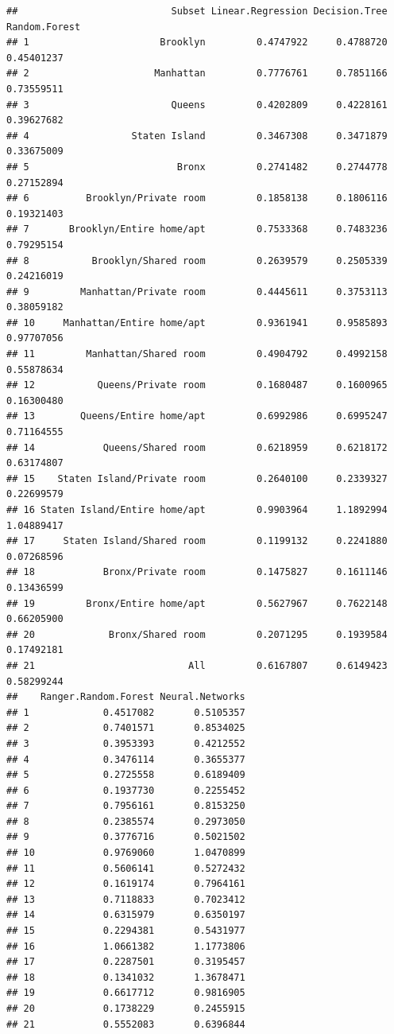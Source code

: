 \documentclass[
]{article}
\begin{document}
\begin{verbatim}
##                           Subset Linear.Regression Decision.Tree Random.Forest
## 1                       Brooklyn         0.4747922     0.4788720    0.45401237
## 2                      Manhattan         0.7776761     0.7851166    0.73559511
## 3                         Queens         0.4202809     0.4228161    0.39627682
## 4                  Staten Island         0.3467308     0.3471879    0.33675009
## 5                          Bronx         0.2741482     0.2744778    0.27152894
## 6          Brooklyn/Private room         0.1858138     0.1806116    0.19321403
## 7       Brooklyn/Entire home/apt         0.7533368     0.7483236    0.79295154
## 8           Brooklyn/Shared room         0.2639579     0.2505339    0.24216019
## 9         Manhattan/Private room         0.4445611     0.3753113    0.38059182
## 10     Manhattan/Entire home/apt         0.9361941     0.9585893    0.97707056
## 11         Manhattan/Shared room         0.4904792     0.4992158    0.55878634
## 12           Queens/Private room         0.1680487     0.1600965    0.16300480
## 13        Queens/Entire home/apt         0.6992986     0.6995247    0.71164555
## 14            Queens/Shared room         0.6218959     0.6218172    0.63174807
## 15    Staten Island/Private room         0.2640100     0.2339327    0.22699579
## 16 Staten Island/Entire home/apt         0.9903964     1.1892994    1.04889417
## 17     Staten Island/Shared room         0.1199132     0.2241880    0.07268596
## 18            Bronx/Private room         0.1475827     0.1611146    0.13436599
## 19         Bronx/Entire home/apt         0.5627967     0.7622148    0.66205900
## 20             Bronx/Shared room         0.2071295     0.1939584    0.17492181
## 21                           All         0.6167807     0.6149423    0.58299244
##    Ranger.Random.Forest Neural.Networks
## 1             0.4517082       0.5105357
## 2             0.7401571       0.8534025
## 3             0.3953393       0.4212552
## 4             0.3476114       0.3655377
## 5             0.2725558       0.6189409
## 6             0.1937730       0.2255452
## 7             0.7956161       0.8153250
## 8             0.2385574       0.2973050
## 9             0.3776716       0.5021502
## 10            0.9769060       1.0470899
## 11            0.5606141       0.5272432
## 12            0.1619174       0.7964161
## 13            0.7118833       0.7023412
## 14            0.6315979       0.6350197
## 15            0.2294381       0.5431977
## 16            1.0661382       1.1773806
## 17            0.2287501       0.3195457
## 18            0.1341032       1.3678471
## 19            0.6617712       0.9816905
## 20            0.1738229       0.2455915
## 21            0.5552083       0.6396844
\end{verbatim}
\end{document}
